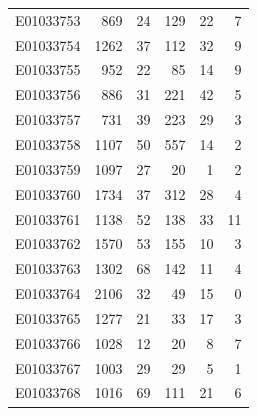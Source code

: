 \documentclass[
  letterpaper,
  DIV=11,
  numbers=noendperiod]{scrreprt}
\begin{document}
\begin{tabular}{lrrrrr}
E01033753     &     869 &      24 &                   129 &                              22 &                       7 \\
E01033754     &    1262 &      37 &                   112 &                              32 &                       9 \\
E01033755     &     952 &      22 &                    85 &                              14 &                       9 \\
E01033756     &     886 &      31 &                   221 &                              42 &                       5 \\
E01033757     &     731 &      39 &                   223 &                              29 &                       3 \\
E01033758     &    1107 &      50 &                   557 &                              14 &                       2 \\
E01033759     &    1097 &      27 &                    20 &                               1 &                       2 \\
E01033760     &    1734 &      37 &                   312 &                              28 &                       4 \\
E01033761     &    1138 &      52 &                   138 &                              33 &                      11 \\
E01033762     &    1570 &      53 &                   155 &                              10 &                       3 \\
E01033763     &    1302 &      68 &                   142 &                              11 &                       4 \\
E01033764     &    2106 &      32 &                    49 &                              15 &                       0 \\
E01033765     &    1277 &      21 &                    33 &                              17 &                       3 \\
E01033766     &    1028 &      12 &                    20 &                               8 &                       7 \\
E01033767     &    1003 &      29 &                    29 &                               5 &                       1 \\
E01033768     &    1016 &      69 &                   111 &                              21 &                       6 \\
\bottomrule
\end{tabular}
\end{document}
